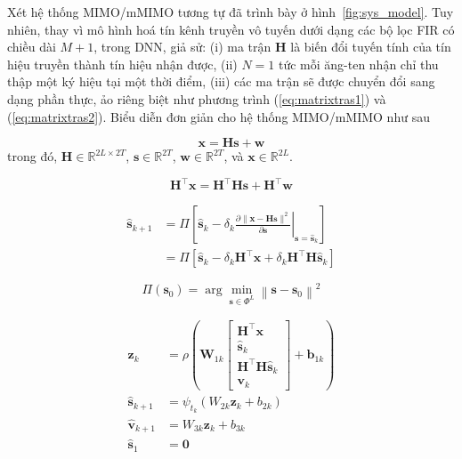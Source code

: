 Xét hệ thống MIMO/mMIMO tương tự đã trình bày ở hình~\ref{fig:sys_model}. Tuy nhiên, thay vì mô hình hoá tín kênh truyền vô tuyến dưới dạng các bộ lọc FIR có chiều dài $M+1$, trong DNN, giả sử: (i) ma trận $\mathbf{H}$ là biến đổi tuyến tính của tín hiệu truyền thành tín hiệu nhận được, (ii) $N=1$ tức mỗi ăng-ten nhận chỉ thu thập một ký hiệu tại một thời điểm, (iii) các ma trận sẽ được chuyển đổi sang dạng phần thực, ảo riêng biệt như phương trình (\ref{eq:matrixtras1}) và (\ref{eq:matrixtras2}). Biểu diễn đơn giản cho hệ thống MIMO/mMIMO như sau

\begin{equation}
    \mathbf{x} = \mathbf{H} \mathbf{s} + \mathbf{w}
\end{equation}
trong đó, $\mathbf{H} \in \mathbb{R}^{2L \times 2T}$, $\mathbf{s} \in \mathbb{R}^{2T}$, $\mathbf{w} \in \mathbb{R}^{2T}$, và $\mathbf{x} \in \mathbb{R}^{2L}$.

\begin{equation}
    \mathbf{H}^\top \mathbf{x}=\mathbf{H}^\top \mathbf{H s}+\mathbf{H}^\top \mathbf{w}
\end{equation}

\begin{equation}
    \begin{aligned}
    \hat{\mathbf{s}}_{k+1} & =\Pi\left[\hat{\mathbf{s}}_k-\left.\delta_k \frac{\partial\|\mathbf{x}-\mathbf{H} \mathbf{s}\|^2}{\partial \mathbf{s}}\right|_{\mathbf{s}=\hat{\mathbf{s}}_k}\right] \\
    & =\Pi\left[\hat{\mathbf{s}}_k-\delta_k \mathbf{H}^\top \mathbf{x}+\delta_k \mathbf{H}^\top \mathbf{H} \hat{\mathbf{s}}_k\right]
    \end{aligned}
\end{equation}

\begin{equation}
    \Pi\left(\mathbf{s}_0\right)=\arg \min _{\mathbf{s} \in \Phi^L}\left\|\mathbf{s}-\mathbf{s}_0\right\|^2
\end{equation}

\begin{subequations}
\begin{alignat}{4}
    \mathbf{z}_k & =\rho\left(\mathbf{W}_{1 k}\left[\begin{array}{c}
    \mathbf{H}^\top \mathbf{x} \\
    \hat{\mathbf{s}}_k \\
    \mathbf{H}^\top \mathbf{H} \hat{\mathbf{s}}_k \\
    \mathbf{v}_k
    \end{array}\right]+\mathbf{b}_{1 k}\right) \\
    \hat{\mathbf{s}}_{k+1} & =\psi_{t_k}\left(W_{2 k} \mathbf{z}_k+b_{2 k}\right) \\
    \hat{\mathbf{v}}_{k+1} & =W_{3 k} \mathbf{z}_k+ b_{3 k} \\
    \hat{\mathbf{s}}_1 & =\mathbf{0}
\end{alignat}
\end{subequations}

